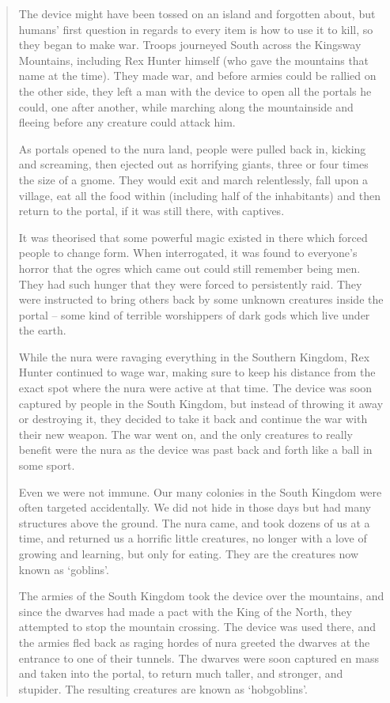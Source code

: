 \begin{quotation}
	The device might have been tossed on an island and forgotten about, but humans' first question in regards to every item is how to use it to kill, so they began to make war.  Troops journeyed South across the Kingsway Mountains, including Rex Hunter himself (who gave the mountains that name at the time).  They made war, and before armies could be rallied on the other side, they left a man with the device to open all the portals he could, one after another, while marching along the mountainside and fleeing before any creature could attack him.

	As portals opened to the nura land, people were pulled back in, kicking and screaming, then ejected out as horrifying giants, three or four times the size of a gnome.  They would exit and march relentlessly, fall upon a village, eat all the food within (including half of the inhabitants) and then return to the portal, if it was still there, with captives.

	It was theorised that some powerful magic existed in there which forced people to change form.  When interrogated, it was found to everyone's horror that the ogres which came out could still remember being men.  They had such hunger that they were forced to persistently raid.  They were instructed to bring others back by some unknown creatures inside the portal -- some kind of terrible worshippers of dark gods which live under the earth.

	While the nura were ravaging everything in the Southern Kingdom, Rex Hunter continued to wage war, making sure to keep his distance from the exact spot where the nura were active at that time.  The device was soon captured by people in the South Kingdom, but instead of throwing it away or destroying it, they decided to take it back and continue the war with their new weapon.  The war went on, and the only creatures to really benefit were the nura as the device was past back and forth like a ball in some sport.

	Even we were not immune.  Our many colonies in the South Kingdom were often targeted accidentally.  We did not hide in those days but had many structures above the ground.  The nura came, and took dozens of us at a time, and returned us a horrific little creatures, no longer with a love of growing and learning, but only for eating.  They are the creatures now known as `goblins'.

	The armies of the South Kingdom took the device over the mountains, and since the dwarves had made a pact with the King of the North, they attempted to stop the mountain crossing.  The device was used there, and the armies fled back as raging hordes of nura greeted the dwarves at the entrance to one of their tunnels.  The dwarves were soon captured en mass and taken into the portal, to return much taller, and stronger, and stupider.  The resulting creatures are known as `hobgoblins'.


\end{quotation}
